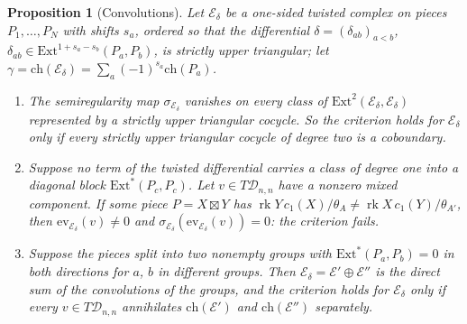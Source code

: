 \documentclass[11pt,reqno]{amsart}
\numberwithin{equation}{section}
\theoremstyle{plain}
\newtheorem{proposition}[theorem]{Proposition}
\theoremstyle{definition}
\newcommand{\Ext}{\mathrm{Ext}}
\newcommand{\ch}{\mathrm{ch}}
\newcommand{\cD}{\mathcal{D}}
\begin{document}
\begin{proposition}[Convolutions]\label{prop:convolution}
Let $\mathcal{E}_{\delta}$ be a one-sided twisted complex on pieces $P_{1},\dots,P_{N}$ with shifts $s_{a}$, ordered so that the differential $\delta=(\delta_{ab})_{a<b}$, $\delta_{ab}\in\Ext^{1+s_{a}-s_{b}}(P_{a},P_{b})$, is strictly upper triangular; let $\gamma=\ch(\mathcal{E}_{\delta})=\sum_{a}(-1)^{s_{a}}\ch(P_{a})$.
\begin{enumerate}[label=\textup{(\roman*)},leftmargin=2.4em,itemsep=2pt]
\item The semiregularity map $\sigma_{\mathcal{E}_{\delta}}$ vanishes on every class of $\Ext^{2}(\mathcal{E}_{\delta},\mathcal{E}_{\delta})$ represented by a strictly upper triangular cocycle. So the criterion holds for $\mathcal{E}_{\delta}$ only if every strictly upper triangular cocycle of degree two is a coboundary.
\item Suppose no term of the twisted differential carries a class of degree one into a diagonal block $\Ext^{*}(P_{c},P_{c})$. Let $v\in T\cD_{n,n}$ have a nonzero mixed component. If some piece $P=X\boxtimes Y$ has $\operatorname{rk}Y\,c_{1}(X)/\theta_{A}\ne\operatorname{rk}X\,c_{1}(Y)/\theta_{A'}$, then $\mathrm{ev}_{\mathcal{E}_{\delta}}(v)\ne0$ and $\sigma_{\mathcal{E}_{\delta}}(\mathrm{ev}_{\mathcal{E}_{\delta}}(v))=0$: the criterion fails.
\item Suppose the pieces split into two nonempty groups with $\Ext^{*}(P_{a},P_{b})=0$ in both directions for $a$, $b$ in different groups. Then $\mathcal{E}_{\delta}=\mathcal{E}'\oplus\mathcal{E}''$ is the direct sum of the convolutions of the groups, and the criterion holds for $\mathcal{E}_{\delta}$ only if every $v\in T\cD_{n,n}$ annihilates $\ch(\mathcal{E}')$ and $\ch(\mathcal{E}'')$ separately.
\end{enumerate}
\end{proposition}
\end{document}
